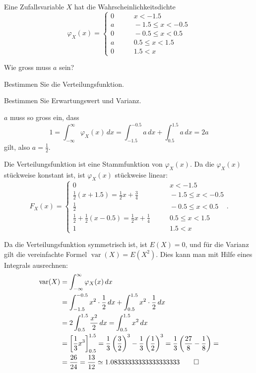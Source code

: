 Eine Zufallsvariable $X$ hat die Wahrscheinlichkeitsdichte
\[
\varphi_X(x)=\begin{cases}
0&\qquad x <-1.5\\
a&\qquad -1.5\le x<-0.5\\
0&\qquad -0.5\le x<0.5\\
a&\qquad 0.5\le x<1.5\\
0&\qquad 1.5<x
\end{cases}
\]
\begin{teilaufgaben}
\item Wie gross muss $a$ sein?
\item Bestimmen Sie die Verteilungsfunktion.
\item Bestimmen Sie Erwartungswert und Varianz.
\end{teilaufgaben}

\begin{loesung}
\begin{teilaufgaben}
\item $a$ muss so gross ein, dass
\[
1=\int_{-\infty}^\infty \varphi_X(x)\,dx=
\int_{-1.5}^{-0.5}a\,dx+\int_{0.5}^{1.5}a\,dx=2a
\]
gilt, also $a=\frac12$.
\item Die Verteilungsfunktion ist eine Stammfunktion von $\varphi_X(x)$.
Da die $\varphi_X(x)$ stückweise konstant ist, ist $\varphi_X(x)$
stückweise linear:
\[
F_X(x)=\begin{cases}
0&\qquad x <-1.5\\
\frac12(x+1.5)=\frac12x+\frac34&\qquad -1.5\le x<-0.5\\
\frac12&\qquad -0.5\le x<0.5\\
\frac12+\frac12(x-0.5)=\frac12x+\frac14&\qquad 0.5\le x<1.5\\
1&\qquad 1.5<x
\end{cases}.
\]
\item Da die Verteilungsfunktion symmetrisch ist, ist $E(X)=0$, und
für die Varianz gilt die vereinfachte Formel $\operatorname{var}(X)=E(X^2)$.
Dies kann man mit Hilfe eines Integrals ausrechnen:
\begin{align*}
\operatorname{var}(X)
&=\int_{-\infty}^\infty \varphi_X(x)\,dx\\
&=\int_{-1.5}^{-0.5}x^2\cdot\frac12\,dx+\int_{0.5}^{1.5} x^2\cdot \frac12\,dx\\
&=2\int_{0.5}^{1.5}\frac{x^2}2\,dx=\int_{0.5}^{1.5}x^2\,dx\\
&=\left[\frac13x^3\right]_{0.5}^{1.5}
 =\frac13\left(\frac32\right)^3-\frac13\left(\frac12\right)^3
=\frac13\left(\frac{27}8-\frac18\right)=
\\
&=\frac{26}{24}=\frac{13}{12}
\simeq 1.08333333333333333333
\qedhere
\end{align*}
\end{teilaufgaben}
\end{loesung}

